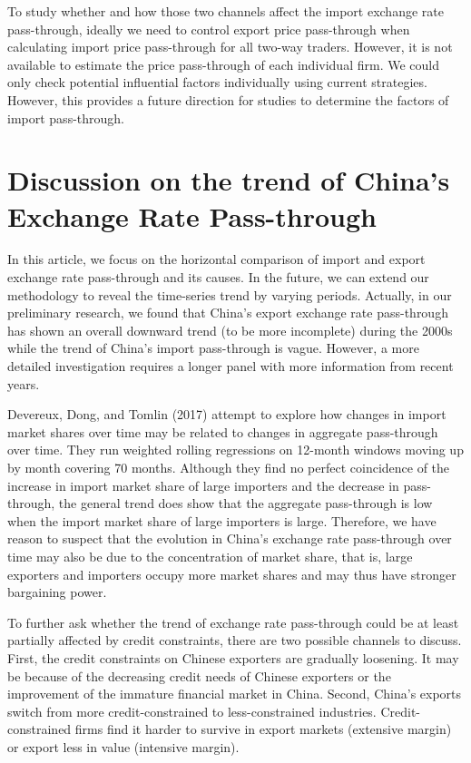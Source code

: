 To study whether and how those two channels affect the import exchange rate pass-through, ideally we need to control export price pass-through when calculating import price pass-through for all two-way traders. However, it is not available to estimate the price pass-through of each individual firm. We could only check potential influential factors individually using current strategies. However, this provides a future direction for studies to determine the factors of import pass-through.

\section{Discussion on the trend of  China’s Exchange Rate Pass-through}

In this article, we focus on the horizontal comparison of import and export exchange rate pass-through and its causes. In the future, we can extend our methodology to reveal the time-series trend by varying periods. Actually, in our preliminary research, we found that China's export exchange rate pass-through has shown an overall downward trend (to be more incomplete) during the 2000s while the trend of China's import pass-through is vague. However, a more detailed investigation requires a longer panel with more information from recent years. 

Devereux, Dong, and Tomlin (2017)\cite{devereux2017} attempt to explore how changes in import market shares over time may be related to changes in aggregate pass-through over time. They run weighted rolling regressions on 12-month windows moving up by month covering 70 months. Although they find no perfect coincidence of the increase in import market share of large importers and the decrease in pass-through, the general trend does show that the aggregate pass-through is low when the import market share of large importers is large. Therefore, we have reason to suspect that the evolution in China's exchange rate pass-through over time may also be due to the concentration of market share, that is, large exporters and importers occupy more market shares and may thus have stronger bargaining power.

To further ask whether the trend of exchange rate pass-through could be at least partially affected by credit constraints, there are two possible channels to discuss. First, the credit constraints on Chinese exporters are gradually loosening. It may be because of the decreasing credit needs of Chinese exporters or the improvement of the immature financial market in China. Second, China's exports switch from more credit-constrained to less-constrained industries. Credit-constrained firms find it harder to survive in export markets (extensive margin) or export less in value (intensive margin).
